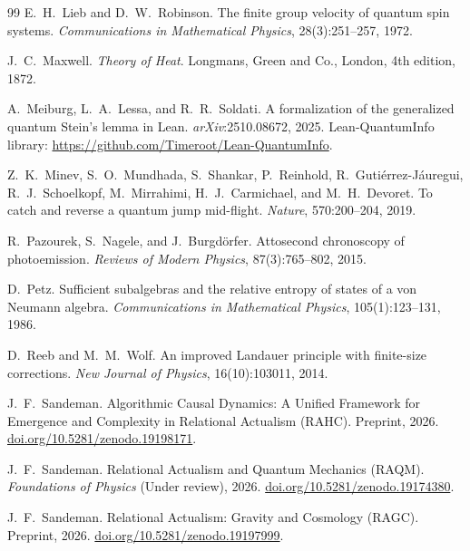 \documentclass[11pt,a4paper]{article}
\theoremstyle{plain}
\theoremstyle{definition}
\theoremstyle{remark}
\begin{document}
\begin{thebibliography}{99}
E.~H.~Lieb and D.~W.~Robinson.
\newblock The finite group velocity of quantum spin systems.
\newblock \textit{Communications in Mathematical Physics}, 28(3):251--257, 1972.

J.~C.~Maxwell.
\newblock \textit{Theory of Heat}.
\newblock Longmans, Green and Co., London, 4th edition, 1872.

A.~Meiburg, L.~A.~Lessa, and R.~R.~Soldati.
\newblock A formalization of the generalized quantum {Stein's} lemma in {Lean}.
\newblock \textit{arXiv}:2510.08672, 2025.
\newblock Lean-QuantumInfo library:
  \url{https://github.com/Timeroot/Lean-QuantumInfo}.

Z.~K.~Minev, S.~O.~Mundhada, S.~Shankar, P.~Reinhold, R.~Guti\'{e}rrez-J\'{a}uregui,
  R.~J.~Schoelkopf, M.~Mirrahimi, H.~J.~Carmichael, and M.~H.~Devoret.
\newblock To catch and reverse a quantum jump mid-flight.
\newblock \textit{Nature}, 570:200--204, 2019.

R.~Pazourek, S.~Nagele, and J.~Burgd\"{o}rfer.
\newblock Attosecond chronoscopy of photoemission.
\newblock \textit{Reviews of Modern Physics}, 87(3):765--802, 2015.

D.~Petz.
\newblock Sufficient subalgebras and the relative entropy of states of a von
  {Neumann} algebra.
\newblock \textit{Communications in Mathematical Physics}, 105(1):123--131,
  1986.


D.~Reeb and M.~M.~Wolf.
\newblock An improved {Landauer} principle with finite-size corrections.
\newblock \textit{New Journal of Physics}, 16(10):103011, 2014.

J.~F.~Sandeman.
\newblock Algorithmic Causal Dynamics: A Unified Framework for Emergence and
  Complexity in Relational Actualism ({RAHC}).
\newblock Preprint, 2026.
\newblock \href{https://doi.org/10.5281/zenodo.19198171}{doi.org/10.5281/zenodo.19198171}.

J.~F.~Sandeman.
\newblock Relational Actualism and Quantum Mechanics ({RAQM}).
\newblock \textit{Foundations of Physics} (Under review), 2026.
\newblock \href{https://doi.org/10.5281/zenodo.19174380}{doi.org/10.5281/zenodo.19174380}.

J.~F.~Sandeman.
\newblock Relational Actualism: Gravity and Cosmology ({RAGC}).
\newblock Preprint, 2026.
\newblock \href{https://doi.org/10.5281/zenodo.19197999}{doi.org/10.5281/zenodo.19197999}.


\end{thebibliography}
\end{document}
